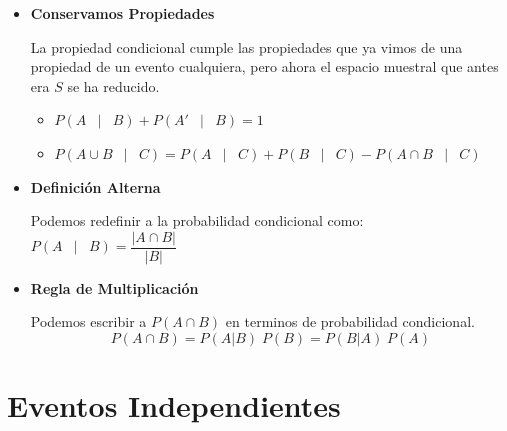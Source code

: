\documentclass[12pt, fleqn]{report}                             %
\DeclareMathOperator \Space {\quad}                             %
\DeclareMathOperator \MiniSpace {\;}                            %
\newcommand \Such {\MiniSpace | \MiniSpace}                     %
\theoremstyle{break}                                            %
\newcommand{\Wrap}[1]{\left( #1 \right)}                        %
\newcommand{\Mag}[1]{\left| #1 \right|}                         %
\begin{document}
                \begin{itemize}

                    \item
                        \textbf{Conservamos Propiedades}

                        La propiedad condicional cumple las propiedades que ya vimos de una propiedad
                        de un evento cualquiera, pero ahora el espacio muestral que antes era $S$ se
                        ha reducido.

                        \begin{itemize}
                            \item $P\Wrap{ A \Such B} + P\Wrap{ A' \Such B} = 1$
                            \item $P\Wrap{ A \cup B \Such C} 
                                        = P\Wrap{A \Such C} + P\Wrap{B \Such C}
                                        - P\Wrap{A \cap B \Such C}$
                        \end{itemize}


                    \item
                        \textbf{Definición Alterna}

                        Podemos redefinir a la probabilidad condicional como: 
                        $P \Wrap{ A \Such B} = \dfrac{\Mag{A \cap B}}{\Mag{B}}$

                    \item 
                        \textbf{Regla de Multiplicación}

                        Podemos escribir a $P(A \cap B)$ en terminos de probabilidad condicional.
                        \begin{equation*}
                            P(A \cap B)
                            = P(A | B) \; P(B)          
                            = P(B | A) \; P(A) 
                        \end{equation*}

                \end{itemize}

                    

        \clearpage
        \section{Eventos Independientes}
\end{document}
